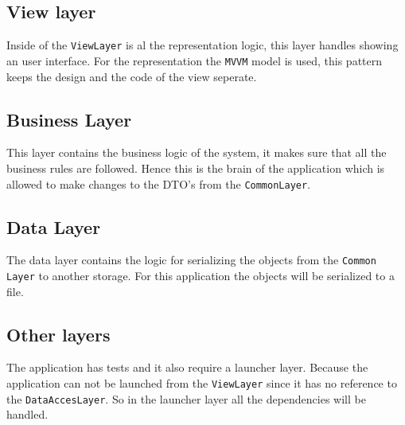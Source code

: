 \subsection{View layer}
Inside of the \texttt{ViewLayer} is al the representation logic, this layer handles showing an user interface. For the representation the \texttt{MVVM} model is used, this pattern keeps the design and the code of the view seperate.

\subsection{Business Layer}
This layer contains the business logic of the system, it makes sure that all the business rules are followed. Hence this is the brain of the application which is allowed to make changes to the DTO's from the \texttt{CommonLayer}.

\subsection{Data Layer}
The data layer contains the logic for serializing the objects from the \texttt{Common Layer} to another storage. For this application the objects will be serialized to a file.

\subsection{Other layers}
The application has tests and it also require a launcher layer. Because the application can not be launched from the \texttt{ViewLayer} since it has no reference to the \texttt{DataAccesLayer}. So in the launcher layer all the dependencies will be handled. 